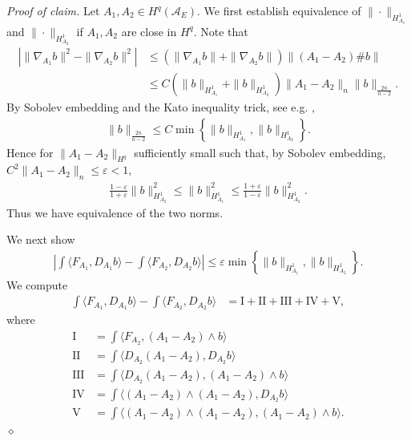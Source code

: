 \documentclass[12pt]{amsart}
\renewcommand{\1}{{\mathbf 1}}
\newenvironment{claimproof}{\par\noindent\textit{Proof of claim.}\space}{\hfill$\diamond$\medskip\par}
\theoremstyle{others}
\numberwithin{equation}{section}
\begin{document}
\begin{claimproof}
    Let \(A_1, A_2 \in H^q(\mathcal{A}_E)\). We first establish equivalence of \(\|\cdot\|_{H_{A_1}^1}\) and \(\| \cdot \|_{H_{A_2}^1}\) if \(A_1, A_2\) are close in \(H^q\). Note that
\begin{align*}
   | \|\nabla_{A_1} b\|^2 - \|\nabla_{A_2} b\|^2| &\leq (\|\nabla_{A_1} b\| + \|\nabla_{A_2} b\|)\|(A_1-A_2) \# b\| \\
        &\leq C\left(\|b\|_{H_{A_1}^1} + \|b\|_{H_{A_2}^1}\right)\|A_1-A_2\|_n \|b\|_{\frac{2n}{n-2}}.
\end{align*} By Sobolev embedding and the Kato inequality trick, see e.g. \cite[(1.16)]{instantons},
\begin{align*}
    \|b\|_{\frac{2n}{n-2}} \leq C\min\left\{\|b\|_{H_{A_1}^1}, \|b\|_{H_{A_2}^1}\right\}.
\end{align*} Hence for \(\|A_1 - A_2\|_{H^q}\) sufficiently small such that, by Sobolev embedding, \(C^2\|A_1 - A_2\|_n \leq \varepsilon < 1\),
\begin{align}\label{lojasiewiczclaim:normequivalence}
    \frac{1-\varepsilon}{1+\varepsilon}\|b\|_{H_{A_2}^1}^2 \leq \|b\|_{H_{A_1}^1}^2 \leq \frac{1+\varepsilon}{1-\varepsilon}\|b\|_{H_{A_2}^1}^2.
\end{align} Thus we have equivalence of the two norms. \par
 We next show \begin{align}\label{lojasiewiczclaim:D*Fequivalence}
    \left|\int \langle F_{A_1}, D_{A_1} b\rangle - \int \langle F_{A_2}, D_{A_2} b\rangle\right| \leq \varepsilon\min\left\{\|b\|_{H_{A_1}^1}, \|b\|_{H_{A_2}^1}\right\}.
\end{align} We compute
\begin{align*}
    \int \langle F_{A_1}, D_{A_1} b\rangle - \int \langle F_{A_2}, D_{A_2} b\rangle & = \text{I} + \text{II} + \text{III} + \text{IV} + \text{V},
\end{align*}where  
\begin{align*}
    \text{I} &= \int \langle F_{A_2}, (A_1 - A_2)\wedge b\rangle \\
    \text{II} &= \int \langle D_{A_2}(A_1 - A_2), D_{A_2} b\rangle \\
    \text{III} &= \int \langle D_{A_2}(A_1-A_2), (A_1-A_2) \wedge b\rangle \\
    \text{IV} &= \int \langle (A_1 - A_2) \wedge (A_1-A_2), D_{A_2} b\rangle \\
    \text{V} &= \int \langle (A_1 - A_2) \wedge (A_1-A_2), (A_1 - A_2) \wedge b\rangle.

\end{align*}
\end{claimproof}
\end{document}
